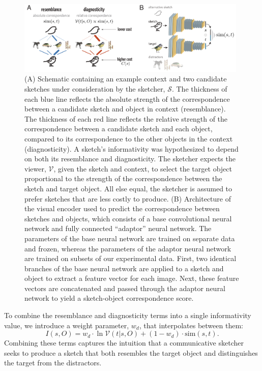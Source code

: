 \documentclass{svjour3}
\begin{document}
\begin{figure}[htbp]
\centering
\includegraphics[width=0.98\textwidth]{4_model_schematic-min.pdf}
\caption{
(A) Schematic containing an example context and two candidate sketches under consideration by the sketcher, $\mathcal{S}$. 
The thickness of each blue line reflects the absolute strength of the correspondence between a candidate sketch and object in context (resemblance). 
The thickness of each red line reflects the relative strength of the correspondence between a candidate sketch and each object, compared to its correspondence to the other objects in the context (diagnosticity). 
A sketch's informativity was hypothesized to depend on both its resemblance and diagnosticity. 
The sketcher expects the viewer, $\mathcal{V}$, given the sketch and context, to select the target object proportional to the strength of the correspondence between the sketch and target object. 
All else equal, the sketcher is assumed to prefer sketches that are less costly to produce.
(B) Architecture of the visual encoder used to predict the correspondence between sketches and objects, which consists of a base convolutional neural network and fully connected ``adaptor'' neural network. 
The parameters of the base neural network are trained on separate data and frozen, whereas the parameters of the adaptor neural network are trained on subsets of our experimental data. 
First, two identical branches of the base neural network are applied to a sketch and object to extract a feature vector for each image. 
Next, these feature vectors are concatenated and passed through the adaptor neural network to yield a sketch-object correspondence score.}
\label{model_schematic}
\end{figure}

To combine the resemblance and diagnosticity terms into a single informativity value, we introduce a weight parameter, $w_{d}$, that interpolates between them:
\begin{equation} \label{prag_interpolation}
I(s,O) = w_{d} \cdot \ln \mathcal{V}(t|s,O) + (1-w_{d}) \cdot \textrm{sim}(s,t). 
\end{equation} 
Combining these terms captures the intuition that a communicative sketcher seeks to produce a sketch that both resembles the target object and distinguishes the target from the distractors.
\end{document}
